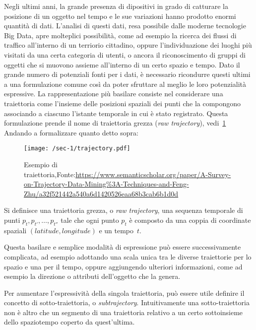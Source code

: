 
Negli ultimi anni, la grande presenza di dipositivi in grado di catturare la posizione di un oggetto nel
tempo e le sue variazioni hanno prodotto enormi quantità di dati.
L'analisi di questi dati, resa possibile dalle moderne tecnologie Big Data, apre molteplici possibilità, come
ad esempio la ricerca dei flussi di traffico all'interno di un terriorio cittadino, oppure l'individuazione
dei luoghi più visitati da una certa categoria di utenti, o ancora il riconoscimento di gruppi di oggetti che si
muovono assieme all'interno di un certo spazio e tempo.
Dato il grande numero di potenziali fonti per i dati, è necessario ricondurre questi ultimi a una formulazione comune
così da poter sfruttare al meglio le loro potenzialità espressive.
La rappresentazione più basilare consiste nel considerare una traiettoria come l'insieme delle posizioni
spaziali dei punti che la compongono associando a ciascuno l'istante temporale in cui è stato registrato.
Questa formulazione prende il nome di traiettoria grezza (\textit{raw trajectory}), vedi~\cref{fig:chap-1:trajectory}
Andando a formalizzare quanto detto sopra:

\begin{figure}
  \centering
  \texttt{[image: /sec-1/trajectory.pdf]}
  \caption{Esempio di traiettoria,Fonte:\url{https://www.semanticscholar.org/paper/A-Survey-on-Trajectory-Data-Mining\%3A-Techniques-and-Feng-Zhu/a32f521442a540a6d1420526eaa68b3cab6b1d0d}}%
  \label{fig:chap-1:trajectory}
\end{figure}

\begin{definition}[Traiettoria]

  Si definisce una traiettoria grezza, o \textit{raw trajectory}, una sequenza temporale di punti \({p_{t}, p_{t'},\ldots, p_{t''}}\)
  tale che ogni punto \(p_{t}\) è composto da una coppia di coordinate spaziali \((latitude, longitude)\) e un tempo~\(t\).

\end{definition}

Questa basilare e semplice modalità di espressione può essere successivamente complicata, ad esempio adottando
una scala unica tra le diverse traiettorie per lo spazio e una per il tempo, oppure aggiungendo ulteriori informazioni, come ad esempio la direzione o attributi
dell'oggetto che la genera.

Per aumentare l'espressività della singola traiettoria, può essere utile definire il concetto di sotto-traiettoria, o \textit{subtrajectory}.
Intuitivamente una sotto-traiettoria non è altro che un segmento di una traiettoria relativo a un certo sottoinsieme dello spaziotempo coperto da quest'ultima.

